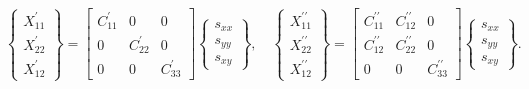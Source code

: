 \begin{equation}

	\left\{ \begin{matrix} 

			X_{11}^{\prime}\\

			X_{22}^{\prime}\\

			X_{12}^{\prime}

		\end{matrix}

		\right\}=\left[\begin{matrix} 

			C_{11}^{\prime} & 0 & 0 \\

			0 & C_{22}^{\prime} & 0 \\

			0 & 0 & C_{33}^{\prime} 

		\end{matrix}\right]\left\{ \begin{matrix} 

			s_{xx}\\

			s_{yy}\\

			s_{xy}

		\end{matrix}

		\right\},\quad\left\{ \begin{matrix} 

			X_{11}^{\prime\prime}\\

			X_{22}^{\prime\prime}\\

			X_{12}^{\prime\prime}

		\end{matrix}

		\right\}=\left[\begin{matrix} 

			C_{11}^{\prime\prime} & C_{12}^{\prime\prime} & 0 \\

			C_{12}^{\prime\prime} & C_{22}^{\prime\prime} & 0 \\

			0 & 0 & C_{33}^{\prime\prime} 

		\end{matrix}\right]\left\{ \begin{matrix} 

			s_{xx}\\

			s_{yy}\\

			s_{xy}

		\end{matrix}

		\right\}.

\end{equation}



